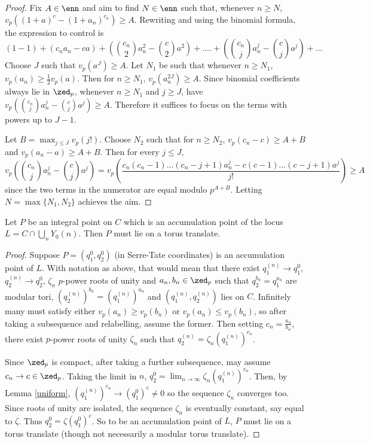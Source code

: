 \documentclass[12pt,letterpaper]{article}
\begin{document}
	\begin{proof}
		Fix $A\in \enn$ and aim to find $N\in \enn$ such that, whenever $n\geq N$, $v_p((1+a)^c-(1+a_n)^{c_n})\geq A$. Rewriting and using the binomial formula, the expression to control is		
		\[(1-1) + (c_na_n-ca) + (\binom{c_n}{2}a_n^2-\binom{c}{2}a^2) + .... + (\binom{c_n}{j}a_n^j-\binom{c}{j}a^j) + ...\]
		Choose $J$ such that  $v_p(a^{J})\geq A$. Let $N_1$ be such that whenever $n\geq N_1$, $v_p(a_n)\geq \frac{1}{2}v_p(a)$. Then for $n\geq N_1$, $v_p(a_n^{2J})\geq A$. Since binomial coefficients always lie in $\zed_p$, whenever $n\geq N_1$ and $j\geq J$, have $v_p(\binom{c_n}{j}a_n^j-\binom{c}{j}a^j)\geq A$. Therefore it suffices to focus on the terms with powers up to $J-1$.
		
		Let $B = \max_{j\leq J} v_p(j!)$. Choose $N_2$ such that for $n\geq N_2$, $v_p(c_n-c)\geq A+B$ and $v_p(a_n-a)\geq A+B$. Then for every $j\leq J$,	
		\[v_p\left(\binom{c_n}{j}a_n^j-\binom{c}{j}a^j\right)=v_p\left(\frac{c_n(c_n-1)...(c_n-j+1)a_n^j-c(c-1)...(c-j+1)a^j}{j!}\right) \geq A\]		
		since the two terms in the numerator are equal modulo $p^{A+B}$. Letting $N=\max\{N_1,N_2\}$ achieves the aim.
	\end{proof}
	
	
	
	
	
	
	
	
	
	\begin{lemma}\label{MustTorus}
		Let $P$ be an integral point on $C$ which is an accumulation point of the locus $L=C\cap \bigcup_nY_0(n)$. Then $P$ must lie on a torus translate.
	\end{lemma}
	
	\begin{proof}	
		Suppose $P =(q_1^0,q_2^0)$ (in Serre-Tate coordinates) is an accumulation point of $L$. With notation as above, that would mean that there exist $q_1^{(n)}\to q_1^0$, $q_2^{(n)}\to q_2^0$, $\zeta_n$ $p$-power roots of unity and $a_n,b_n\in \zed_p$ such that $q_2^{b_n} = q_1^{a_n}$ are modular tori, $(q_2^{(n)})^{b_n}= (q_1^{(n)})^{a_n}$ and $(q_1^{(n)},q_2^{(n)})$ lies on $C$. Infinitely many must satisfy either $v_p(a_n)\geq v_p(b_n)$ or $v_p(a_n)\leq v_p(b_n)$, so after taking a subsequence and relabelling, assume the former. Then setting $c_n = \frac{a_n}{b_n}$, there exist  $p$-power roots of unity $\zeta_n$ such that $q_2^{(n)}= \zeta_n(q_1^{(n)})^{c_n}$.
		
		Since $\zed_p$ is compact, after taking a further subsequence, may assume $c_n\to c\in \zed_p$. Taking the limit in $n$, $q_2^0=\lim_{n\to\infty}\zeta_n(q_1^{(n)})^{c_n}$. Then, by Lemma \ref{uniform}, $(q_1^{(n)})^{c_n}\to (q_1^0)^c\ne0$ so the sequence $\zeta_n$ converges too. Since roots of unity are isolated, the sequence $\zeta_n$ is eventually constant, say equal to $\zeta$. Thus $q_2^0 = \zeta(q_1^0)^c$. So to be an accumulation point of $L$, $P$ must lie on a torus translate (though not necessarily a modular torus translate).
	\end{proof}
	
\end{document}
